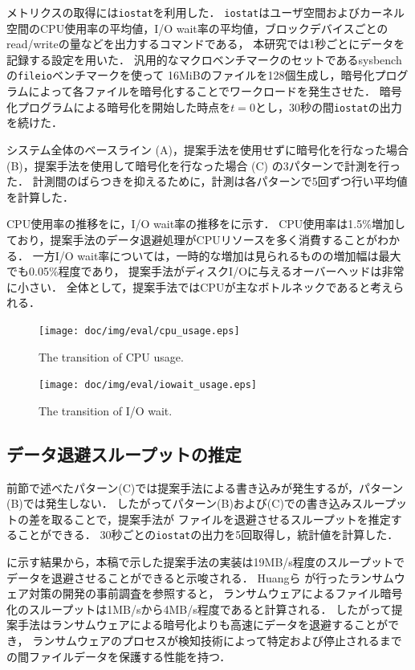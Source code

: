 メトリクスの取得には\texttt{iostat}を利用した．
\texttt{iostat}はユーザ空間およびカーネル空間のCPU使用率の平均値，I/O wait率の平均値，ブロックデバイスごとのread/writeの量などを出力するコマンドである，
本研究では1秒ごとにデータを記録する設定を用いた．
汎用的なマクロベンチマークのセットであるsysbench \cite{sysbench:online} の\texttt{fileio}ベンチマークを使って
16MiBのファイルを128個生成し，暗号化プログラムによって各ファイルを暗号化することでワークロードを発生させた．
暗号化プログラムによる暗号化を開始した時点を$t = 0$とし，30秒の間\texttt{iostat}の出力を続けた．

システム全体のベースライン (A)，提案手法を使用せずに暗号化を行なった場合 (B)，提案手法を使用して暗号化を行なった場合 (C) の3パターンで計測を行った．
計測間のばらつきを抑えるために，計測は各パターンで5回ずつ行い平均値を計算した．

CPU使用率の推移をに，I/O wait率の推移をに示す．
CPU使用率は1.5\%増加しており，提案手法のデータ退避処理がCPUリソースを多く消費することがわかる．
一方I/O wait率については，一時的な増加は見られるものの増加幅は最大でも0.05\%程度であり，
提案手法がディスクI/Oに与えるオーバーヘッドは非常に小さい．
全体として，提案手法ではCPUが主なボトルネックであると考えられる．

\begin{figure}[tb]
  \centering
  \texttt{[image: doc/img/eval/cpu\_usage.eps]}
  \caption{The transition of CPU usage.}
  \label{fig:cpu-usage}
\end{figure}

\begin{figure}[tb]
  \centering
  \texttt{[image: doc/img/eval/iowait\_usage.eps]}
  \caption{The transition of I/O wait.}
  \label{fig:iowait}
\end{figure}

\subsection{データ退避スループットの推定}
前節で述べたパターン(C)では提案手法による書き込みが発生するが，パターン(B)では発生しない．
したがってパターン(B)および(C)での書き込みスループットの差を取ることで，提案手法が
ファイルを退避させるスループットを推定することができる．
30秒ごとの\texttt{iostat}の出力を5回取得し，統計値を計算した．

に示す結果から，本稿で示した提案手法の実装は19MB/s程度のスループットで
データを退避させることができると示唆される．
Huangら \cite{huang2017flashguard} が行ったランサムウェア対策の開発の事前調査を参照すると，
ランサムウェアによるファイル暗号化のスループットは1MB/sから4MB/s程度であると計算される．
したがって提案手法はランサムウェアによる暗号化よりも高速にデータを退避することができ，
ランサムウェアのプロセスが検知技術によって特定および停止されるまでの間ファイルデータを保護する性能を持つ．

